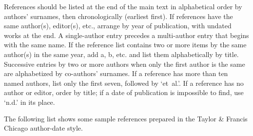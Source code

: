 \documentclass[]{interact}
\theoremstyle{plain}%
\theoremstyle{definition}
\theoremstyle{remark}
\begin{document}
References should be listed at the end of the main text in alphabetical order by authors' surnames, then chronologically (earliest first).
If references have the same author(s), editor(s), etc., arrange by year of publication, with undated works at the end.
A single-author entry precedes a multi-author entry that begins with the same name.
If the reference list contains two or more items by the same author(s) in the same year, add a, b, etc. and list them alphabetically by title.
Successive entries by two or more authors when only the first author is the same are alphabetized by co-authors' surnames.
If a reference has more than ten named authors, list only the first seven, followed by `et~al.'.
If a reference has no author or editor, order by title; if a date of publication is impossible to find, use `n.d.' in its place.

The following list shows some sample references prepared in the Taylor \& Francis Chicago author-date style.
\end{document}

